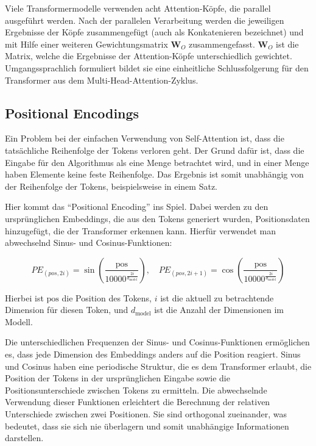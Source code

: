 Viele Transformermodelle verwenden acht Attention-Köpfe, die parallel ausgeführt werden.  
Nach der parallelen Verarbeitung werden die jeweiligen Ergebnisse der Köpfe zusammengefügt (auch als Konkatenieren bezeichnet) und mit Hilfe einer weiteren Gewichtungsmatrix \( \mathbf{W}_{O} \) zusammengefasst.  
\( \mathbf{W}_{O} \) ist die Matrix, welche die Ergebnisse der Attention-Köpfe unterschiedlich gewichtet.  
Umgangssprachlich formuliert bildet sie eine einheitliche Schlussfolgerung für den Transformer aus dem Multi-Head-Attention-Zyklus.

\subsection{Positional Encodings}

Ein Problem bei der einfachen Verwendung von Self-Attention ist, dass die tatsächliche Reihenfolge der Tokens verloren geht.  
Der Grund dafür ist, dass die Eingabe für den Algorithmus als eine Menge betrachtet wird, und in einer Menge haben Elemente keine feste Reihenfolge.  
Das Ergebnis ist somit unabhängig von der Reihenfolge der Tokens, beispielsweise in einem Satz.

Hier kommt das \enquote{Positional Encoding} ins Spiel.  
Dabei werden zu den ursprünglichen Embeddings, die aus den Tokens generiert wurden, Positionsdaten hinzugefügt, die der Transformer erkennen kann.  
Hierfür verwendet man abwechselnd Sinus- und Cosinus-Funktionen:

\[
PE_{(pos, 2i)} = \sin\left(\frac{\text{pos}}{10000^{\frac{2i}{d_{\text{model}}}}}\right), \quad
PE_{(pos, 2i+1)} = \cos\left(\frac{\text{pos}}{10000^{\frac{2i}{d_{\text{model}}}}}\right)
\]

Hierbei ist \( \text{pos} \) die Position des Tokens, \( i \) ist die aktuell zu betrachtende Dimension für diesen Token, und \( d_{\text{model}} \) ist die Anzahl der Dimensionen im Modell.

Die unterschiedlichen Frequenzen der Sinus- und Cosinus-Funktionen ermöglichen es, dass jede Dimension des Embeddings anders auf die Position reagiert.  
Sinus und Cosinus haben eine periodische Struktur, die es dem Transformer erlaubt, die Position der Tokens in der ursprünglichen Eingabe sowie die Positionsunterschiede zwischen Tokens zu ermitteln.  
Die abwechselnde Verwendung dieser Funktionen erleichtert die Berechnung der relativen Unterschiede zwischen zwei Positionen.  
Sie sind orthogonal zueinander, was bedeutet, dass sie sich nie überlagern und somit unabhängige Informationen darstellen.
